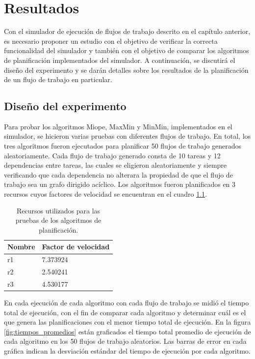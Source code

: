 \chapter{Resultados}


Con el simulador de ejecución de flujos de trabajo descrito en el capítulo anterior, es necesario proponer un estudio con el objetivo de verificar la correcta funcionalidad del simulador y también con el objetivo de comparar los algoritmos de planificación implementados del simulador. A continuación, se discutirá el diseño del experimento y se darán detalles sobre los resultados de la planificación de un flujo de trabajo en particular.

\section{Diseño del experimento}

Para probar los algoritmos Miope, MaxMin y MinMin, implementados en el simulador, se hicieron varias pruebas con diferentes flujos de trabajo. En total, los tres algoritmos fueron ejecutados para planificar 50 flujos de trabajo generados aleatoriamente. Cada flujo de trabajo generado consta de 10 tareas y 12 dependencias entre tareas, las cuales se eligieron aleatoriamente y siempre verificando que cada dependencia no alterara la propiedad de que el flujo de trabajo sea un grafo dirigido acíclico. Los algoritmos fueron planificados en 3 recursos cuyos factores de velocidad se encuentran en el cuadro \ref{table:resources}.

\begin{table}
\begin{center}
\begin{tabular}{|l|l|}
\hline
Nombre&Factor de velocidad\\
\hline
r1&7.373924\\
\hline
r2&2.540241\\
\hline
r3&4.530177\\
\hline
\end{tabular}
\end{center}
\label{table:resources}
\caption{Recursos utilizados para las pruebas de los algoritmos de planificación.}
\end{table}

En cada ejecución de cada algoritmo con cada flujo de trabajo se midió el tiempo total de ejecución, con el fin de comparar cada algoritmo y determinar cuál es el que genera las planificaciones con el menor tiempo total de ejecución. En la figura \ref{fig:tiempos_promedios} están graficados el tiempo total promedio de ejecución de cada algoritmo en los 50 flujos de trabajo aleatorios. Las barras de error en cada gráfica indican la desviación estándar del tiempo de ejecución por cada algoritmo.

